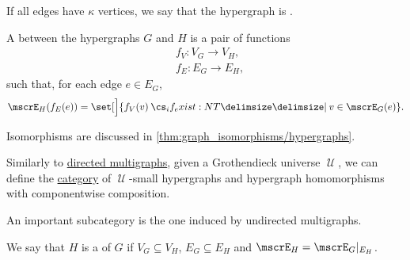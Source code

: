 \begin{definition}
\begin{thmenum}[resume=def:hypergraph]
     If all edges have \( \kappa \) vertices, we say that the hypergraph is .

     A  between the hypergraphs \( G \) and \( H \) is a pair of functions
    \begin{align*}
      &f_V: V_G \to V_H, \\
      &f_E: E_G \to E_H,
    \end{align*}
    such that, for each edge \( e \in E_G \),
    \begin{equation}\label{eq:def:hypergraph/homomorphism}
      \mscrE_H(f_E(e)) = \set[\Big]{ f_V(v) \given* v \in \mscrE_G(e) }.
    \end{equation}

    Isomorphisms are discussed in \cref{thm:graph_isomorphisms/hypergraphs}.

     Similarly to \hyperref[def:directed_multigraph]{directed multigraphs}, given a Grothendieck universe \( \mscrU \), we can define the \hyperref[def:category]{category} of \( \mscrU \)-small hypergraphs and hypergraph homomorphisms with componentwise composition.

    An important subcategory is the one induced by undirected multigraphs.

    \mimprovised We say that \( H \) is a  of \( G \) if \( V_G \subseteq V_H \), \( E_G \subseteq E_H \) and \( \mscrE_H = \mscrE_G\restr_{E_H} \).
  \end{thmenum}
\end{definition}
